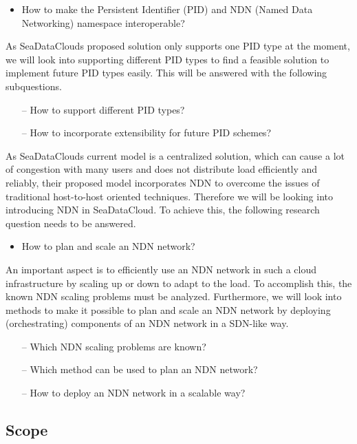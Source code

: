 \begin{itemize}
	\item How to make the Persistent Identifier (PID) and NDN (Named Data Networking) namespace interoperable?
\end{itemize}

As SeaDataClouds proposed solution only supports one PID type at the moment, we will look into supporting different PID types to find a feasible solution to implement future PID types easily. This will be answered with the following subquestions.
\begin{itemize}
    \item[--] How to support different PID types?
    \item[--] How to incorporate extensibility for future PID schemes?
\end{itemize}

As SeaDataClouds current model is a centralized solution, which can cause a lot of congestion with many users and does not distribute load efficiently and reliably, their proposed model incorporates NDN to overcome the issues of traditional host-to-host oriented techniques. Therefore we will be looking into introducing NDN in SeaDataCloud. To achieve this, the following research question needs to be answered.   
\begin{itemize}
    \item How to plan and scale an NDN network?
\end{itemize}

An important aspect is to efficiently use an NDN network in such a cloud infrastructure by scaling up or down to adapt to the load. To accomplish this, 
the known NDN scaling problems must be analyzed. Furthermore, we will look into methods to make it possible to plan and scale an NDN network by deploying (orchestrating) components of an NDN network in a SDN-like way.
\begin{itemize}
    \item[--] Which NDN scaling problems are known?
    \item[--] Which method can be used to plan an NDN network?
    \item[--] How to deploy an NDN network in a scalable way?
\end{itemize}


\subsection{Scope}

